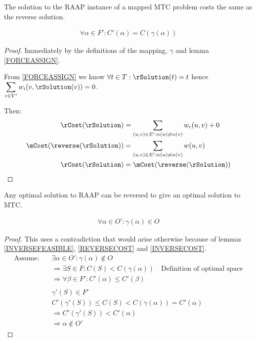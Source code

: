 \begin{lemma}
\label{REVERSECOST}
The solution to the RAAP instance of a mapped MTC problem costs the same as the reverse solution.

\begin{align}
	\nonumber \forall \alpha \in F' : C'(\alpha) = C(\gamma(\alpha))
\end{align}
\end{lemma}
\begin{proof}
Immediately by the definitions of the mapping, $\gamma$ and lemma \ref{FORCEASSIGN}.

From \ref{FORCEASSIGN} we know $\forall t \in T : \rSolution(t) = t$ hence $\displaystyle\sum\limits_{v \in V'} w_i(v, \rSolution(v)) = 0$.

Then:
\begin{align}
	\nonumber \rCost(\rSolution) & = \displaystyle\sum\limits_{(u,v) \in E' : \alpha(u) \neq \alpha(v)} w_c(u,v) + 0 \\
	\nonumber \mCost(\reverse(\rSolution)) & = \displaystyle\sum\limits_{(u,v) \in E' : \alpha(u) \neq \alpha(v)} w(u,v) \\
	\nonumber \rCost(\rSolution) & = \mCost(\reverse(\rSolution))
\end{align}
\end{proof}

\begin{lemma}
\label{REVERSEOPTIMAL}
Any optimal solution to RAAP can be reversed to give an optimal solution to MTC.

\begin{align}
	\nonumber \forall \alpha \in O' : \gamma(\alpha) \in O
\end{align}
\end{lemma}
\begin{proof}
This uses a contradiction that would arise otherwise because of lemmas \ref{INVERSEFEASIBLE}, \ref{REVERSECOST} and \ref{INVERSECOST}.
\begin{align}
	\nonumber \mbox{Assume:} \quad & \exists \alpha \in O' : \gamma(\alpha) \not\in O \\
	\nonumber & \Rightarrow \exists S \in F : C(S) < C(\gamma(\alpha)) \quad \mbox{Definition of optimal space} \\
	\nonumber & \Rightarrow \forall \beta \in F' : C'(\alpha) \leq C'(\beta) \\
	\nonumber \\
	\nonumber & \gamma'(S) \in F' \\
	\nonumber & C'(\gamma'(S)) \leq C(S) < C(\gamma(\alpha)) = C'(\alpha) \\
	\nonumber & \Rightarrow C'(\gamma'(S)) < C'(\alpha) \\
	\nonumber & \Rightarrow \alpha \not\in O'
\end{align}
\end{proof}